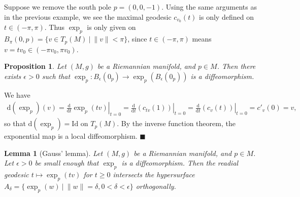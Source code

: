 \documentclass[letter-paper]{tufte-book}
\newtheorem{lemma}[theorem]{\color{pastel-blue}Lemma}
\newtheorem{proposition}[theorem]{\color{pastel-blue}Proposition}
\newenvironment{proof}[1][Proof]{\begin{trivlist}
\item[\hskip \labelsep {\bfseries #1}]}{\end{trivlist}}
\newenvironment{example}[1][Example]{\begin{trivlist}
\item[\hskip \labelsep {\bfseries #1}]}{\end{trivlist}}
\newcommand{\qed}{\hfill$\blacksquare$}
\begin{document}
\begin{example}
  Suppose we remove the south pole $p=(0,0,-1)$. Using the same arguments as in the previous example, we see the maximal geodesic $c_{v_0}(t)$ is only defined on $t\in(-\pi, \pi)$. Thus $\exp_p$ is only given on $B_\pi(0,p) = \{v\in T_p(M)\ |\ \|v\|<\pi\}$, since $t\in(-\pi, \pi)$ means $v = tv_0 \in (-\pi v_0, \pi v_0)$.
\end{example}

\begin{proposition}
  Let $(M,g)$ be a Riemannian manifold, and $p\in M$. Then there exists $\epsilon > 0$ such that $\exp_p : B_\epsilon(0_p) \to \exp_p(B_\epsilon(0_p))$ is a diffeomorphism.
\end{proposition}

\begin{proof}
  We have
  \begin{align*}
    \mathrm{d}(\exp_p)(v) = \left.\frac{\mathrm{d}}{\mathrm{d}t}\exp_p(tv)\right|_{t=0} = \left.\frac{\mathrm{d}}{\mathrm{d}t}(c_{tv}(1))\right|_{t=0} = \left.\frac{\mathrm{d}}{\mathrm{d}t}(c_v(t))\right|_{t=0} = c'_v(0) = v,
  \end{align*}
  so that $\mathrm{d}(\exp_p) = \mbox{Id}$ on $T_p(M)$. By the inverse function theorem, the exponential map is a local diffeomorphism. \qed
\end{proof}

\begin{lemma}[Gauss' lemma]
  Let $(M,g)$ be a Riemannian manifold, and $p\in M$. Let $\epsilon > 0$ be small enough that $\exp_p$ is a diffeomorphism. Then the readial geodesic $t \mapsto \exp_p(tv)$ for $t\geq 0$ intersects the hypersurface $A_\delta = \{\exp_p(w)\ |\ \|w\|=\delta, 0 < \delta < \epsilon\}$ orthogonally.
\end{lemma}
\end{document}
